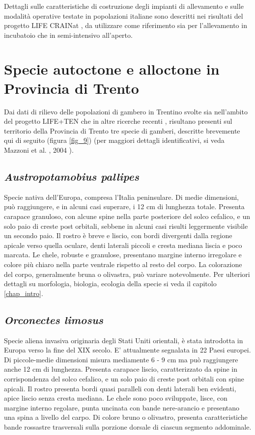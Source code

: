 \documentclass[11pt,a4paper,italian,twoside,openany]{memoir}
\newcommand{\etal}{et al. }
\begin{document}
Dettagli sulle caratteristiche di costruzione degli impianti di allevamento e sulle modalità operative testate in popolazioni italiane sono descritti nei risultati del progetto LIFE CRAINat \cite{AA.VV. 2014}, da utilizzare come riferimento sia per l'allevamento in incubatoio che in semi-intensivo all'aperto.


\section{Specie autoctone e alloctone in Provincia di Trento}
Dai dati di rilievo delle popolazioni di gambero in Trentino svolte sia nell'ambito del progetto LIFE+TEN \cite{Endrizzi 2014} che in altre ricerche recenti \cite{Ciutti 2013} \cite{Endrizzi 2013} \cite{Cappelletti 2014}, risultano presenti sul territorio della Provincia di Trento tre specie di gamberi, descritte brevemente qui di seguito (figura \ref{fig_9}) (per maggiori dettagli identificativi, si veda Mazzoni \etal, 2004 \cite{Mazzoni 2004}).

\subsection{\emph{Austropotamobius pallipes}} 
Specie nativa dell'Europa, compresa l'Italia peninsulare. Di medie dimensioni, può raggiungere, e in alcuni casi superare, i 12 cm di lunghezza totale. Presenta carapace granuloso, con alcune spine nella parte posteriore del solco cefalico, e un solo paio di creste post orbitali, sebbene in alcuni casi risulti leggermente visibile un secondo paio. Il rostro è breve e liscio, con bordi divergenti dalla regione apicale verso quella oculare, denti laterali piccoli e cresta mediana liscia e poco marcata. Le chele, robuste e granulose, presentano margine interno irregolare e colore più chiaro nella parte ventrale rispetto al resto del corpo. La colorazione del corpo, generalmente bruna o olivastra, può variare notevolmente. Per ulteriori dettagli su morfologia, biologia, ecologia della specie si veda il capitolo \ref{chap_intro}.

\subsection{\emph{Orconectes limosus}}
Specie aliena invasiva originaria degli Stati Uniti orientali, è stata introdotta in Europa verso la fine del XIX secolo. E' attualmente segnalata in 22 Paesi europei. Di piccole-medie dimensioni misura mediamente 6 - 9 cm ma può raggiungere anche 12 cm di lunghezza. Presenta carapace liscio, caratterizzato da spine in corrispondenza del solco cefalico, e un solo paio di creste post orbitali con spine apicali. Il rostro presenta bordi quasi paralleli con denti laterali ben evidenti, apice liscio senza cresta mediana. Le chele sono poco sviluppate, lisce, con margine interno regolare, punta uncinata con bande nere-arancio e presentano una spina a livello del carpo. Di colore bruno o olivastro, presenta caratteristiche bande rossastre trasversali sulla porzione dorsale di ciascun segmento addominale.
\end{document}
